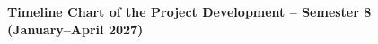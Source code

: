 \clearpage

\begin{figure}[!htbp]
    \centering
    
    \caption{\textbf{Timeline Chart of the Project
    Development -- Semester 8 (January--April 2027)}}
    \label{fig:timeline-sem8}
\end{figure}



